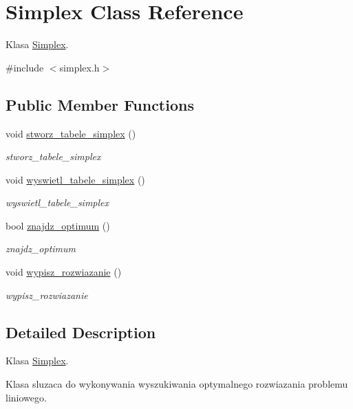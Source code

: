 \hypertarget{class_simplex}{\section{Simplex Class Reference}
\label{class_simplex}
}


Klasa \hyperlink{class_simplex}{Simplex}.  




{\ttfamily \#include $<$simplex.\+h$>$}

\subsection*{Public Member Functions}
\begin{DoxyCompactItemize}
\item 
void \hyperlink{class_simplex_a062eece7edeb3ac63e0602aa24def76d}{stworz\+\_\+tabele\+\_\+simplex} ()
\begin{DoxyCompactList}\small\item\em stworz\+\_\+tabele\+\_\+simplex \end{DoxyCompactList}\item 
void \hyperlink{class_simplex_aea45878cae6594ed33270900f333fcd6}{wyswietl\+\_\+tabele\+\_\+simplex} ()
\begin{DoxyCompactList}\small\item\em wyswietl\+\_\+tabele\+\_\+simplex \end{DoxyCompactList}\item 
bool \hyperlink{class_simplex_adee58270ca5e0c092a07dd68de242c1d}{znajdz\+\_\+optimum} ()
\begin{DoxyCompactList}\small\item\em znajdz\+\_\+optimum \end{DoxyCompactList}\item 
void \hyperlink{class_simplex_a98b721845fe82e3e1630e42b4dc1dea4}{wypisz\+\_\+rozwiazanie} ()
\begin{DoxyCompactList}\small\item\em wypisz\+\_\+rozwiazanie \end{DoxyCompactList}\end{DoxyCompactItemize}


\subsection{Detailed Description}
Klasa \hyperlink{class_simplex}{Simplex}. 

Klasa sluzaca do wykonywania wyszukiwania optymalnego rozwiazania problemu liniowego. 

